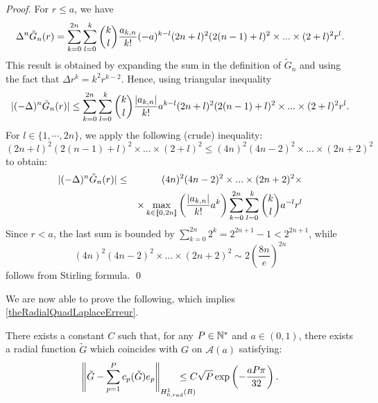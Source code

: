 \documentclass[smallextended]{svjour3}
\begin{document}
\begin{proof} For $r \leq a$, we have
	\[\Delta^n \tilde{G}_n(r) = \sum_{k=0}^{2n}\sum_{l=0}^k \dbinom{k}{l}\dfrac{a_{k,n}}{k!}(-a)^{k-l}(2n+l)^2 (2(n-1)+l)^2\times ... \times (2+l)^2 r^{l}.\]
	This result is obtained by expanding the sum in the definition of $\tilde{G}_n$ and using the fact that $\Delta r^k = k^2r^{k-2}$. Hence, using triangular inequality
	\[|(-\Delta)^n \tilde{G}_n(r)| \leq \sum_{k=0}^{2n}\sum_{l=0}^k \dbinom{k}{l}\dfrac{|a_{k,n}|}{k!}a^{k-l}(2n+l)^2(2(n-1)+l)^2\times ... \times (2+l)^2r^{l}.\]	
	For $l\in \{1,\cdots,2n\}$, we apply the following (crude) inequality:
	\begin{equation}
		(2n+l)^2(2(n-1)+l)^2\times ... \times (2+l)^2 \leq (4n)^2(4n-2)^2 \times ... \times (2n+2)^2
		\label{estimationTresGrossiere}
	\end{equation}
	to obtain: 
	\begin{eqnarray*}		
		|(-\Delta)^n \tilde{G}_n(r)| &\leq& (4n)^2(4n-2)^2 \times ... \times (2n+2)^2\times\\
		&&\times\max_{k\in\llbracket 0,2n\rrbracket}\left(\dfrac{|a_{k,n}|}{k!}a^k\right)\sum_{k=0}^{2n}\sum_{l=0}^k \dbinom{k}{l}a^{-l}r^l	
	\end{eqnarray*}
	Since $r<a$, the last sum is bounded by $\displaystyle\sum_{k=0}^{2n}2^k = 2^{2n+1}-1 < 2^{2n+1}$,
	while 
	\[(4n)^2(4n-2)^2\times...\times (2n+2)^2 \sim 2\left(\dfrac{8n}{e}\right)^{2n}\]
	follows from Stirling formula. 
	\qed
\end{proof}
We are now able to prove the following, which implies \autoref{theRadialQuadLaplaceErreur}.
\begin{theorem}
	\label{The:DecroissanceErreurProlongementPoly}
	There exists a constant $C$ such that, for any $P \in \mathbb{N}^*$ and $a \in (0,1)$, there exists a radial function $\tilde{G}$ which coincides with $G$ on $\mathcal{A}(a)$ satisfying:
	\[\norm{\tilde{G} - \sum_{p=1}^{P}c_p(\tilde{G})e_p}_{\Hzrad} \hspace{-0.7cm}\leq C \sqrt{P} \exp\left(-\frac{aP\pi}{32}\right).\]
							
\end{theorem}
\end{document}
